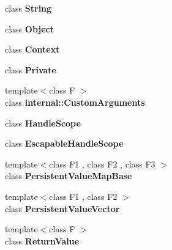 \begin{DoxyCompactItemize}
\item 
class {\bfseries String}\hypertarget{classv8_1_1_local_a7fb804f7dc96dd9f705c84095f37f1ca}{}\label{classv8_1_1_local_a7fb804f7dc96dd9f705c84095f37f1ca}

\item 
class {\bfseries Object}\hypertarget{classv8_1_1_local_a0720b5f434e636e22a3ed34f847eec57}{}\label{classv8_1_1_local_a0720b5f434e636e22a3ed34f847eec57}

\item 
class {\bfseries Context}\hypertarget{classv8_1_1_local_ac26c806e60ca4a0547680edb68f6e39b}{}\label{classv8_1_1_local_ac26c806e60ca4a0547680edb68f6e39b}

\item 
class {\bfseries Private}\hypertarget{classv8_1_1_local_ac96b60d37bd806132da680e187dc2288}{}\label{classv8_1_1_local_ac96b60d37bd806132da680e187dc2288}

\item 
{\footnotesize template$<$class F $>$ }\\class {\bfseries internal\+::\+Custom\+Arguments}\hypertarget{classv8_1_1_local_a07108678a2af25caab612879ed7dca62}{}\label{classv8_1_1_local_a07108678a2af25caab612879ed7dca62}

\item 
class {\bfseries Handle\+Scope}\hypertarget{classv8_1_1_local_a5f127e488db492b05c8542cec0b880b7}{}\label{classv8_1_1_local_a5f127e488db492b05c8542cec0b880b7}

\item 
class {\bfseries Escapable\+Handle\+Scope}\hypertarget{classv8_1_1_local_ade20a528f8ee42d426959f061cff29ff}{}\label{classv8_1_1_local_ade20a528f8ee42d426959f061cff29ff}

\item 
{\footnotesize template$<$class F1 , class F2 , class F3 $>$ }\\class {\bfseries Persistent\+Value\+Map\+Base}\hypertarget{classv8_1_1_local_a08e2b8f164392d71811ce6cc134f33e3}{}\label{classv8_1_1_local_a08e2b8f164392d71811ce6cc134f33e3}

\item 
{\footnotesize template$<$class F1 , class F2 $>$ }\\class {\bfseries Persistent\+Value\+Vector}\hypertarget{classv8_1_1_local_a978bb1377559897d74d5fe883a54a315}{}\label{classv8_1_1_local_a978bb1377559897d74d5fe883a54a315}

\item 
{\footnotesize template$<$class F $>$ }\\class {\bfseries Return\+Value}\hypertarget{classv8_1_1_local_a53f604d3d6f2dc0647df33c9979f116a}{}\label{classv8_1_1_local_a53f604d3d6f2dc0647df33c9979f116a}


\end{DoxyCompactItemize}
